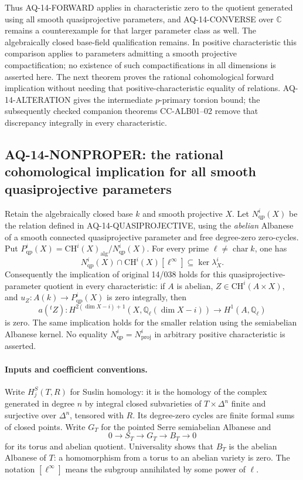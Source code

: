 Thus AQ-14-FORWARD applies in characteristic zero to the
quotient generated using all smooth quasiprojective
parameters, and AQ-14-CONVERSE over $\mathbb C$ remains
a counterexample for that larger parameter class as
well. The algebraically closed base-field qualification
remains. In positive characteristic this comparison
applies to parameters admitting a smooth projective
compactification; no existence of such compactifications
in all dimensions is asserted here. The next theorem proves the
rational cohomological forward implication without needing that
positive-characteristic equality of relations. AQ-14-ALTERATION gives the intermediate $p$-primary torsion bound; the subsequently checked companion theorems CC-ALB01--02 remove that discrepancy integrally in every characteristic.

\subsection{AQ-14-NONPROPER: the rational cohomological implication for all smooth quasiprojective parameters}
Retain the algebraically closed base $k$ and smooth projective $X$.
Let $N^i_{\mathrm{qp}}(X)$ be the relation defined in
AQ-14-QUASIPROJECTIVE, using the \emph{abelian} Albanese of a
smooth connected quasiprojective parameter and free degree-zero
zero-cycles. Put
$P^i_{\mathrm{qp}}(X)=\mathrm{CH}^i(X)_{\mathrm{alg}}/
N^i_{\mathrm{qp}}(X)$. For every prime
$\ell\ne\operatorname{char}k$, one has
\[
 N^i_{\mathrm{qp}}(X)\cap\mathrm{CH}^i(X)[\ell^\infty]
       \subseteq\ker\lambda_X^i.                            \tag{AQ.14.2}
\]
Consequently the implication of original 14/038 holds for this
quasiprojective-parameter quotient in every characteristic:
if $A$ is abelian, $Z\in\mathrm{CH}^i(A\times X)$, and
$u_Z:A(k)\to P^i_{\mathrm{qp}}(X)$ is zero integrally, then
\[
 a({}^tZ):H^{2(\dim X-i)+1}(X,\mathbb Q_\ell(\dim X-i))
                       \longrightarrow H^1(A,\mathbb Q_\ell)
\]
is zero. The same implication holds for the smaller relation
using the semiabelian Albanese kernel. No equality
$N^i_{\mathrm{qp}}=N^i_{\mathrm{proj}}$ in arbitrary positive
characteristic is asserted.

\paragraph{Inputs and coefficient conventions.}
Write $H_j^S(T,R)$ for Suslin homology: it is the homology of
the complex generated in degree $n$ by integral closed
subvarieties of $T\times\Delta^n$ finite and surjective over
$\Delta^n$, tensored with $R$. Its degree-zero cycles are
finite formal sums of closed points. Write $G_T$ for the
pointed Serre semiabelian Albanese and
\[
 0\longrightarrow S_T\longrightarrow G_T\longrightarrow B_T
       \longrightarrow0
\]
for its torus and abelian quotient. Universality shows that
$B_T$ is the abelian Albanese of $T$: a homomorphism from a
torus to an abelian variety is zero. The notation $[\ell^\infty]$
means the subgroup annihilated by some power of $\ell$.


